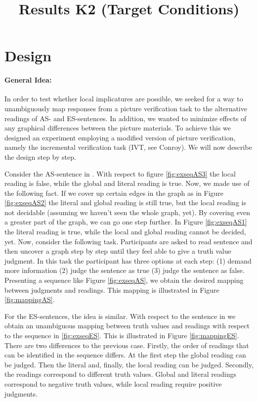 \documentclass[a4paper,10pt]{article}
\title{Results K2 (Target Conditions)}
\author{}
\begin{document}
\maketitle

\begin{abstract}

\end{abstract}

\section{Design}

\paragraph{General Idea:} In order to test whether local implicatures are possible, we seeked for a way to unambiguously map responses from a picture verification task to the alternative readings of AS- and ES-sentences. In addition, we wanted to minimize effects of any graphical differences between the picture materials. To achieve this we designed an experiment employing a modified version of picture verification, namely the incremental verification task (IVT, see Conroy). We will now describe the design step by step.

Consider the AS-sentence in \Next. With respect to figure \ref{fig:exseqAS3} the local reading is false, while the global and literal reading is true. Now, we made use of the following fact. If we cover up certain edges in the graph as in Figure \ref{fig:exseqAS2} the literal and global reading is still true, but the local reading is not decidable (assuming we haven't seen the whole graph, yet). By covering even a greater part of the graph, we can go one step further. In Figure \ref{fig:exseqAS1} the literal reading is true, while the local and global reading cannot be decided, yet. Now, consider the following task. Participants are asked to read sentence \Next and then uncover a graph step by step until they feel able to give a truth value judgment. In this task the participant has three options at each step: (1) demand more information (2) judge the sentence as true (3) judge the sentence as false. Presenting a sequence like Figure \ref{fig:exseqAS}, we obtain the desired mapping between judgments and readings. This mapping is illustrated in Figure \ref{fig:mappingAS}.


For the ES-sentences, the idea is similar. With respect to the sentence in \NNext we obtain an unambiguous mapping between truth values and readings with respect to the sequence in \ref{fig:exseqES}. This is illustrated in Figure \ref{fig:mappingES}. There are two differences to the previous case. Firstly, the order of readings that can be identified in the sequence differs. At the first step the global reading can be judged. Then the literal and, finally, the local reading can be judged. Secondly, the readings correspond to different truth values. Global and literal readings correspond to negative truth values, while local reading require positive judgments.  
\end{document}
